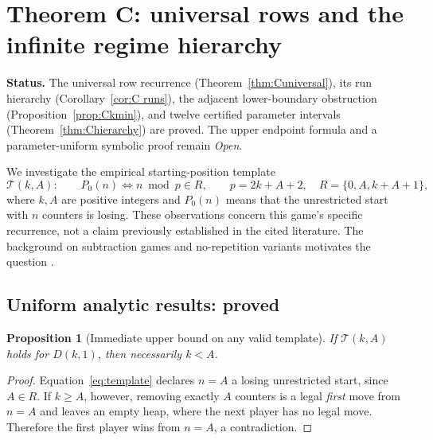 \documentclass[11pt]{article}
\newtheorem{proposition}[theorem]{Proposition}
\theoremstyle{remark}
\begin{document}
\section{Theorem C: universal rows and the infinite regime hierarchy}\label{sec:C}
\textbf{Status.} The universal row recurrence (Theorem~\ref{thm:Cuniversal}), its run hierarchy (Corollary~\ref{cor:C runs}), the adjacent lower-boundary obstruction (Proposition~\ref{prop:Ckmin}), and twelve certified parameter intervals (Theorem~\ref{thm:Chierarchy}) are proved. The upper endpoint formula and a parameter-uniform symbolic proof remain \emph{Open}.

We investigate the empirical starting-position template
\begin{equation}\label{eq:template}
\mathcal{T}(k,A):\qquad P_0(n)\iff n\bmod p\in R,\qquad
p=2k+A+2,\quad R=\{0,A,k+A+1\},
\end{equation}
where $k,A$ are positive integers and $P_0(n)$ means that the unrestricted start with $n$ counters is losing. These observations concern this game's specific recurrence, not a claim previously established in the cited literature. The background on subtraction games and no-repetition variants motivates the question \cite{winningways2001,gurvich2012}.

\subsection{Uniform analytic results: proved}
\begin{proposition}[Immediate upper bound on any valid template]\label{prop:Cupper}
If $\mathcal{T}(k,A)$ holds for $D(k,1)$, then necessarily $k<A$.
\end{proposition}
\begin{proof}
Equation~\eqref{eq:template} declares $n=A$ a losing unrestricted start, since $A\in R$. If $k\ge A$, however, removing exactly $A$ counters is a legal \emph{first} move from $n=A$ and leaves an empty heap, where the next player has no legal move. Therefore the first player wins from $n=A$, a contradiction.
\end{proof}
\end{document}
